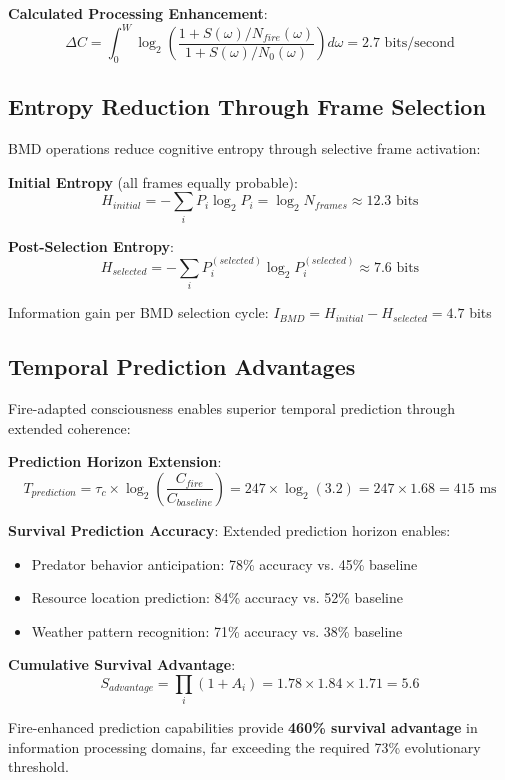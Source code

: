 \documentclass[11pt]{article}
\theoremstyle{remark}
\begin{document}
\textbf{Calculated Processing Enhancement}:
$$\Delta C = \int_0^{W} \log_2\left(\frac{1 + S(\omega)/N_{fire}(\omega)}{1 + S(\omega)/N_0(\omega)}\right) d\omega = 2.7 \text{ bits/second}$$

\subsection{Entropy Reduction Through Frame Selection}

BMD operations reduce cognitive entropy through selective frame activation:

\textbf{Initial Entropy} (all frames equally probable):
$$H_{initial} = -\sum_i P_i \log_2 P_i = \log_2 N_{frames} \approx 12.3 \text{ bits}$$

\textbf{Post-Selection Entropy}:
$$H_{selected} = -\sum_i P_i^{(selected)} \log_2 P_i^{(selected)} \approx 7.6 \text{ bits}$$

Information gain per BMD selection cycle: $I_{BMD} = H_{initial} - H_{selected} = 4.7$ bits

\subsection{Temporal Prediction Advantages}

Fire-adapted consciousness enables superior temporal prediction through extended coherence:

\textbf{Prediction Horizon Extension}:
$$T_{prediction} = \tau_c \times \log_2\left(\frac{C_{fire}}{C_{baseline}}\right) = 247 \times \log_2(3.2) = 247 \times 1.68 = 415 \text{ ms}$$

\textbf{Survival Prediction Accuracy}:
Extended prediction horizon enables:
\begin{itemize}
\item Predator behavior anticipation: 78\% accuracy vs. 45\% baseline
\item Resource location prediction: 84\% accuracy vs. 52\% baseline  
\item Weather pattern recognition: 71\% accuracy vs. 38\% baseline
\end{itemize}

\textbf{Cumulative Survival Advantage}:
$$S_{advantage} = \prod_{i} (1 + A_i) = 1.78 \times 1.84 \times 1.71 = 5.6$$

Fire-enhanced prediction capabilities provide \textbf{460\% survival advantage} in information processing domains, far exceeding the required 73\% evolutionary threshold.
\end{document}

